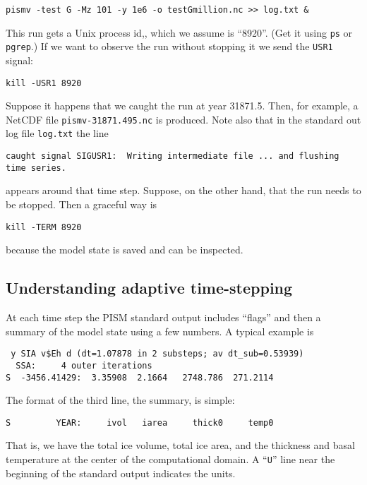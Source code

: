 \begin{verbatim}
pismv -test G -Mz 101 -y 1e6 -o testGmillion.nc >> log.txt &
\end{verbatim}

\noindent This run gets a Unix process id,, which we assume is ``8920''.  (Get it using \texttt{ps} or \texttt{pgrep}.)  If we want to observe the run without stopping it we send the \texttt{USR1} signal:

\begin{verbatim}
kill -USR1 8920
\end{verbatim}

\noindent Suppose it happens that we caught the run at year 31871.5.  Then, for example, a NetCDF file \texttt{pismv-31871.495.nc} is produced.  Note also that in the standard out log file \texttt{log.txt} the line

\begin{verbatim}
caught signal SIGUSR1:  Writing intermediate file ... and flushing time series.
\end{verbatim}
\noindent appears around that time step.  Suppose, on the other hand, that the run needs to be stopped.  Then a graceful way is

\begin{verbatim}
kill -TERM 8920
\end{verbatim}

\noindent because the model state is saved and can be inspected.



\subsection{Understanding adaptive time-stepping} \label{subsect:adapt}

At each time step the PISM standard output includes ``flags'' and then a summary of the model state using a few numbers.  A typical example is
\small
\begin{verbatim}
 y SIA v$Eh d (dt=1.07878 in 2 substeps; av dt_sub=0.53939)
  SSA:     4 outer iterations
S  -3456.41429:  3.35908  2.1664   2748.786  271.2114
\end{verbatim}
\normalsize
\noindent The format of the third line, the summary, is simple:
\small
\begin{verbatim}
S         YEAR:     ivol   iarea     thick0     temp0
\end{verbatim}
\normalsize
That is, we have the total ice volume, total ice area, and the thickness and basal temperature at the center of the computational domain.  A ``\texttt{U}'' line near the beginning of the standard output indicates the units.

